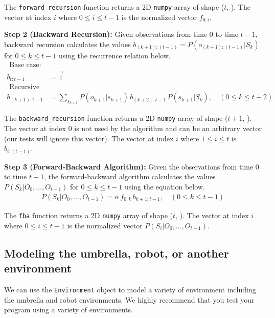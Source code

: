 \documentclass[12pt]{article}
\begin{document}
The \verb+forward_recursion+ function returns a 2D \verb+numpy+ array of shape ($t$, ). The vector at index $i$ where $0 \le i \le t - 1$ is the normalized vector $f_{0:i}$.

{\bf Step 2 (Backward Recursion): } Given observations from time $0$ to time $t-1$, backward recursion calculates the values $b_{(k+1):(t-1)} = P(o_{(k+1):(t-1)} | S_{k})$ for $0 \le k \le t-1$ using the recurrence relation below.
%
\begin{align}
\text{ Base case: } \\
b_{t:t-1} & = \vec{1} \\
\text{ Recursive case: } \\
b_{(k+1):t-1} & = \sum_{s_{k+1}} P(o_{k+1} | s_{k+1} ) \, b_{(k+2):t-1} \, P(s_{k+1} | S_k ),\quad (0 \le k \le t-2) 
\end{align}

The \verb+backward_recursion+ function returns a 2D \verb+numpy+ array of shape ($t+1$, ). 
%
The vector at index $0$ is not used by the algorithm and can be an arbitrary vector (our tests will ignore this vector).
%
The vector at index $i$ where $1 \le i \le t$ is $b_{i:(t-1)}$.

{\bf Step 3 (Forward-Backward Algorithm): } Given the observations from time $0$ to time $t-1$, the forward-backward algorithm calculates the values $P(S_k | O_0, \dots, O_{t-1})$ for $0 \le k \le t-1$ using the equation below.
%
\begin{align}
P(S_k | O_0, \dots, O_{t-1}) = \alpha \, f_{0:k} \, b_{k+1:t-1}, \quad (0 \le k \le t - 1)
\end{align}

The \verb+fba+ function returns a 2D \verb+numpy+ array of shape ($t$, ). 
%
The vector at index $i$ where $0 \le i \le t-1$ is the normalized vector $P(S_i | O_0, \dots, O_{t-1})$.


\newpage
\subsection{Modeling the umbrella, robot, or another environment}
\label{sec:modeling_environment}

We can use the \verb+Environment+ object to model a variety of environment including the umbrella and robot environments. We highly recommend that you test your program using a variety of environments.
\end{document}
